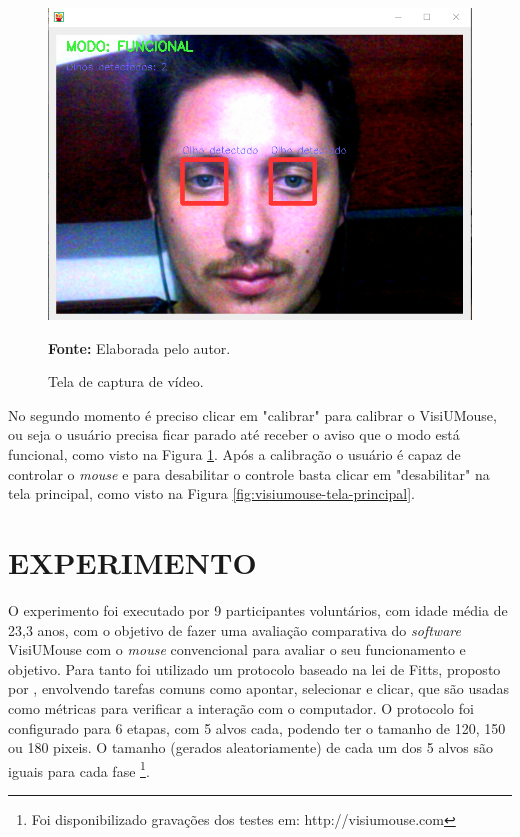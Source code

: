 \begin{figure}[htbp]
\caption{Tela de captura de vídeo.} 
\centering \includegraphics[scale=.35]{img/visiumouse-tela-captura-video.png}

\textbf{Fonte:} Elaborada pelo autor.
\label{fig:visiumouse-tela-captura-video}
\end{figure}

No segundo momento é preciso clicar em "calibrar" para calibrar o VisiUMouse, ou seja o usuário precisa ficar parado até receber o aviso que o modo está funcional, como visto na Figura \ref{fig:visiumouse-tela-captura-video}. Após a calibração o usuário é capaz de controlar o \textit{mouse} e para desabilitar o controle basta clicar em "desabilitar" na tela principal, como visto na Figura \ref{fig:visiumouse-tela-principal}.

\chapter{EXPERIMENTO}\label{CAP7}


O experimento foi executado por 9 participantes voluntários, com idade média de 23,3 anos, com o objetivo de fazer uma avaliação comparativa do \textit{software} VisiUMouse com o \textit{mouse} convencional para avaliar o seu funcionamento e objetivo. Para tanto foi utilizado um protocolo baseado na lei de Fitts, proposto por , envolvendo tarefas comuns como apontar, selecionar e clicar, que são usadas como métricas para verificar a interação com o computador. O protocolo foi configurado para 6 etapas, com 5 alvos cada, podendo ter o tamanho de 120, 150 ou 180 pixeis. O tamanho (gerados aleatoriamente) de cada um dos 5 alvos são iguais para cada fase \footnote{Foi disponibilizado gravações dos testes em: http://visiumouse.com}.

